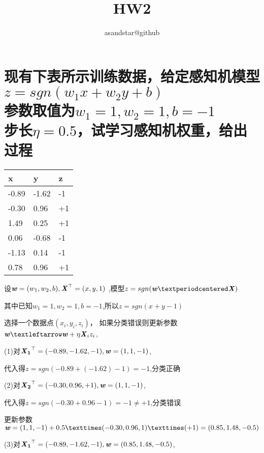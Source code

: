 \documentclass[UTF8]{ctexart}
\author{asandstar@github}
\title{HW2}
\begin{document}
\maketitle
\section{现有下表所示训练数据，给定感知机模型
$z = sgn(w_{1}x + w_{2} y + b)$\\
参数取值为$w_{1}=1,w_{2}=1,b=-1$\\
步长$\eta =0.5$，试学习感知机权重，给出过程}
\begin{table}[!h]
    \centering
    \setlength{\tabcolsep}{10mm}
    \begin{tabular}{|l|l|l|}
        \hline
        x     & y     & z  \\ \hline
        -0.89 & -1.62 & -1 \\ \hline
        -0.30 & 0.96  & +1 \\ \hline
        1.49  & 0.25  & +1 \\ \hline
        0.06  & -0.68 & -1 \\ \hline
        -1.13 & 0.14  & -1 \\ \hline
        0.78  & 0.96  & +1 \\ \hline
    \end{tabular}
\end{table}
设$\textbf{\emph{w}}=(w_{1},w_{2},b),\mathbf{\textbf {\emph{X}}}^\top=(x,y,1)$
,模型$z = sgn(\textbf{\emph{w}}·\textbf {\emph{X}})$

其中已知$w_{1}=1,w_{2}=1,b=-1$,所以$z = sgn(x +  y -1)$

选择一个数据点$(x_{i},y_{i},z_{i})$，
如果分类错误则更新参数
$\textbf{\emph{w}}←\textbf{\emph{w}}+\eta \textbf{\emph{X}}_i z_{i}$,

(1)对$\mathbf{\textbf {\emph{X}}_1}^\top=(-0.89,-1.62,-1),
    \textbf{\emph{w}}=(1,1,-1)$,

代入得$z=sgn(-0.89+(-1.62)-1)=-1$,分类正确

(2)对$\mathbf{\textbf {\emph{X}}_2}^\top=(-0.30,0.96,+1),
    \textbf{\emph{w}}=(1,1,-1)$,

代入得$z=sgn(-0.30+0.96-1)=-1 \neq +1$,分类错误

更新参数$\textbf{\emph{w}}=(1,1,-1)+0.5× (-0.30,0.96,1)×(+1)
    =(0.85,1.48,-0.5)$

(3)对$\mathbf{\textbf {\emph{X}}_1}^\top=(-0.89,-1.62,-1),
    \textbf{\emph{w}}=(0.85,1.48,-0.5)$,
\end{document}
